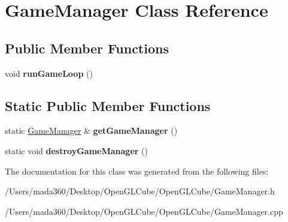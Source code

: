 \hypertarget{class_game_manager}{}\section{Game\+Manager Class Reference}
\label{class_game_manager}
\subsection*{Public Member Functions}
\begin{DoxyCompactItemize}
\item 
\hypertarget{class_game_manager_a829e2ea5acdffac6770877cfae585139}{}void {\bfseries run\+Game\+Loop} ()\label{class_game_manager_a829e2ea5acdffac6770877cfae585139}

\end{DoxyCompactItemize}
\subsection*{Static Public Member Functions}
\begin{DoxyCompactItemize}
\item 
\hypertarget{class_game_manager_aa08a255191c165e7d47e37ea61cb3171}{}static \hyperlink{class_game_manager}{Game\+Manager} \& {\bfseries get\+Game\+Manager} ()\label{class_game_manager_aa08a255191c165e7d47e37ea61cb3171}

\item 
\hypertarget{class_game_manager_aea5ff4f47b90e72f242fe542b3c78c06}{}static void {\bfseries destroy\+Game\+Manager} ()\label{class_game_manager_aea5ff4f47b90e72f242fe542b3c78c06}

\end{DoxyCompactItemize}


The documentation for this class was generated from the following files\+:\begin{DoxyCompactItemize}
\item 
/\+Users/mada360/\+Desktop/\+Open\+G\+L\+Cube/\+Open\+G\+L\+Cube/Game\+Manager.\+h\item 
/\+Users/mada360/\+Desktop/\+Open\+G\+L\+Cube/\+Open\+G\+L\+Cube/Game\+Manager.\+cpp\end{DoxyCompactItemize}
